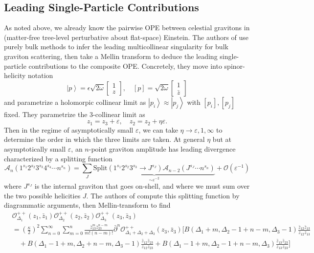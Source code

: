 \documentclass[11pt,letterpaper]{article}
\newcommand{\LP}{\left(}
\newcommand{\RP}{\right)}
\newcommand{\mc}[1]{\mathcal{#1}}
\newcommand{\D}{\partial}
\newcommand{\KET}[1]{\left| #1 \right\rangle }
\begin{document}
\subsection{Leading Single-Particle Contributions}
As noted above, we already know the pairwise OPE between celestial gravitons in (matter-free tree-level perturbative about flat-space) Einstein. The authors of \cite{Ball:2023sdz, Guevara:2024ixn} use purely bulk methods to infer the leading multicollinear singularity for bulk graviton scattering, then take a Mellin transform to deduce the leading single-particle contributions to the composite OPE. Concretely, they move into spinor-helicity notation \begin{equation}
\KET{p} = \epsilon \sqrt{2 \omega} \begin{bmatrix} 1 \\ z \end{bmatrix}, \quad [p] = \sqrt{2 \omega} \begin{bmatrix} 1 \\ \bar{z} \end{bmatrix}
\end{equation}
and parametrize a holomorpic collinear limit as $\KET{p_i} \approx \KET{p_j}$ with $[p_i], [p_j]$ fixed. They parametrize the 3-collinear limit as \begin{equation}
z_1 = z_3 + \varepsilon, \quad z_2 = z_2 + \eta \varepsilon.
\end{equation}
Then in the regime of asymptotically small $\varepsilon$, we can take $\eta \to \varepsilon, 1, \infty$ to determine the order in which the three limits are taken. At general $\eta$ but at asymptotically small $\varepsilon$, an $n$-point graviton amplitude has leading divergence characterized by a splitting function \begin{equation}
\mc{A}_n \LP 1^{s_1} 2^{s_2} 3^{s_3} 4^{s_4} \cdots n^{s_n} \RP = \sum_J \underbrace{\mbox{Split} \LP 1^{s_1} 2^{s_2} 3^{s_3} \to J^{s_J} \RP \mc{A}_{n-2} \LP J^{s_J} \cdots n^{s_n} \RP}_{\sim \varepsilon^{-2}} + \mc{O} \LP \varepsilon^{-1} \RP 
\end{equation}
where $J^{s_J}$ is the internal graviton that goes on-shell, and where we must sum over the two possible helicities $J$. The authors of \cite{Ball:2023sdz} compute this splitting function by diagrammatic arguments, then Mellin-transform to find \begin{equation}
\begin{aligned}
& \mc{O}^{++}_{\Delta_1}(z_1, \bar{z}_1)
\mc{O}^{++}_{\Delta_2}(z_2, \bar{z}_2)
\mc{O}^{++}_{\Delta_3}(z_3, \bar{z}_3) \\
& = \LP \frac{\kappa}{2} \RP^2 \sum_{n=0}^\infty \sum_{m=0}^n \frac{\bar{z}_{13}^m \bar{z}^{n-m}_{23}}{m! (n-m)!} \bar{\D}^n \mc{O}^{++}_{\Delta_1 + \Delta_2 + \Delta_3}(z_3, \bar{z}_3) \Bigg[ B(\Delta_1 + m, \Delta_2 - 1 + n - m, \Delta_3 - 1) \frac{\bar{z}_{12} \bar{z}_{13}}{z_{12} z_{13}} \\
& \quad + B(\Delta_1 - 1 + m, \Delta_2 + n - m, \Delta_3 - 1) \frac{\bar{z}_{12} \bar{z}_{23}}{z_{12} z_{23}} + B(\Delta_1 - 1 + m, \Delta_2 - 1 + n - m, \Delta_3) \frac{\bar{z}_{13} \bar{z}_{23}}{z_{13} z_{23}} \Bigg]
\end{aligned}
\end{equation}
\end{document}
